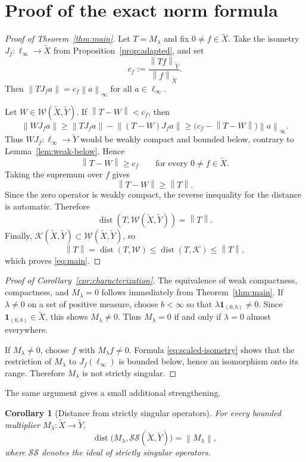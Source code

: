 \documentclass[11pt]{article}
\newtheorem{corollary}[theorem]{Corollary}
\theoremstyle{remark}
\newcommand{\dist}{\operatorname{dist}}
\newcommand{\K}{\mathcal K}
\newcommand{\W}{\mathcal W}
\newcommand{\StrictSing}{\mathcal{SS}}
\newcommand{\tX}{\widetilde X}
\newcommand{\tY}{\widetilde Y}
\newcommand{\norm}[1]{\left\lVert #1\right\rVert}
\newcommand{\one}{\mathbf 1}
\begin{document}
\section{Proof of the exact norm formula}

\begin{proof}[Proof of Theorem~\ref{thm:main}]
Let $T=M_\lambda$ and fix $0\neq f\in\tX$.  Take the isometry
$J_f:\ell_\infty\to\tX$ from Proposition~\ref{prop:adapted}, and set
\[
 c_f:=\frac{\norm{Tf}_{\tY}}{\norm{f}_{\tX}}.
\]
Then $\norm{TJ_fa}=c_f\norm{a}_\infty$ for all $a\in\ell_\infty$.

Let $W\in\W(\tX,\tY)$.  If $\norm{T-W}<c_f$, then
\[
 \norm{WJ_fa}
 \geq \norm{TJ_fa}-\norm{(T-W)J_fa}
 \geq \bigl(c_f-\norm{T-W}\bigr)\norm{a}_\infty.
\]
Thus $WJ_f:\ell_\infty\to\tY$ would be weakly compact and bounded below,
contrary to Lemma~\ref{lem:weak-below}.  Hence
\[
 \norm{T-W}\geq c_f
 \qquad\text{for every }0\neq f\in\tX.
\]
Taking the supremum over $f$ gives
\[
 \norm{T-W}\geq\norm{T}.
\]
Since the zero operator is weakly compact, the reverse inequality for the
distance is automatic.  Therefore
\[
 \dist(T,\W(\tX,\tY))=\norm{T}.
\]
Finally, $\K(\tX,\tY)\subset\W(\tX,\tY)$, so
\[
 \norm{T}
 =\dist(T,\W)
 \leq\dist(T,\K)
 \leq\norm{T},
\]
which proves \eqref{eq:main}.
\end{proof}

\begin{proof}[Proof of Corollary~\ref{cor:characterization}]
The equivalence of weak compactness, compactness, and $M_\lambda=0$ follows
immediately from Theorem~\ref{thm:main}.  If $\lambda\neq0$ on a set of
positive measure, choose $b<\infty$ so that
$\lambda\one_{(0,b)}\neq0$.  Since $\one_{(0,b)}\in\tX$, this shows
$M_\lambda\neq0$.  Thus $M_\lambda=0$ if and only if $\lambda=0$ almost
everywhere.

If $M_\lambda\neq0$, choose $f$ with $M_\lambda f\neq0$.  Formula
\eqref{eq:scaled-isometry} shows that the restriction of $M_\lambda$ to
$J_f(\ell_\infty)$ is bounded below, hence an isomorphism onto its range.
Therefore $M_\lambda$ is not strictly singular.
\end{proof}

The same argument gives a small additional strengthening.

\begin{corollary}[Distance from strictly singular operators]
For every bounded multiplier $M_\lambda:\tX\to\tY$,
\[
 \dist\bigl(M_\lambda,\StrictSing(\tX,\tY)\bigr)=\norm{M_\lambda},
\]
where $\StrictSing$ denotes the ideal of strictly singular operators.
\end{corollary}
\end{document}
